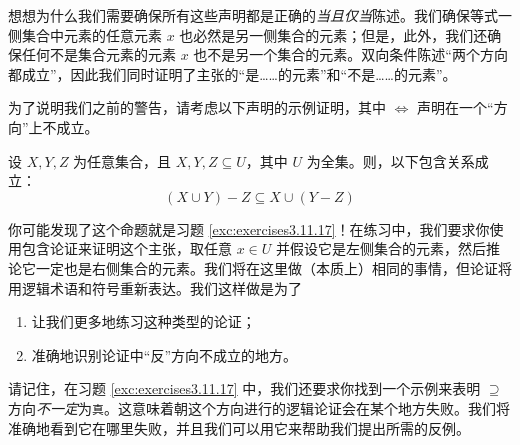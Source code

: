 想想为什么我们需要确保所有这些声明都是正确的\emph{当且仅当}陈述。我们确保等式一侧集合中元素的任意元素 $x$ 也必然是另一侧集合的元素；但是，此外，我们还确保任何不是集合元素的元素 $x$ 也不是另一个集合的元素。双向条件陈述``两个方向都成立''，因此我们同时证明了主张的``是……的元素''和``不是……的元素''。

为了说明我们之前的警告，请考虑以下声明的示例证明，其中 $\iff$ 声明在一个``方向''上不成立。

\begin{proposition}\label{prop:proposition4.6.11}
    设 $X, Y, Z$ 为任意集合，且 $X, Y, Z \subseteq U$，其中 $U$ 为全集。则，以下包含关系成立：
    \[(X \cup Y ) - Z \subseteq X \cup (Y - Z)\]
\end{proposition}

你可能发现了这个命题就是习题 \ref{exc:exercises3.11.17}！在练习中，我们要求你使用包含论证来证明这个主张，取任意 $x \in U$ 并假设它是左侧集合的元素，然后推论它一定也是右侧集合的元素。我们将在这里做（本质上）相同的事情，但论证将用逻辑术语和符号重新表达。我们这样做是为了
\begin{enumerate}
    \item 让我们更多地练习这种类型的论证；
    \item 准确地识别论证中``反''方向不成立的地方。 
\end{enumerate}
请记住，在习题 \ref{exc:exercises3.11.17} 中，我们还要求你找到一个示例来表明 $\supseteq$ 方向\emph{不一定}为\verb|真|。这意味着朝这个方向进行的逻辑论证会在某个地方失败。我们将准确地看到它在哪里失败，并且我们可以用它来帮助我们提出所需的反例。

